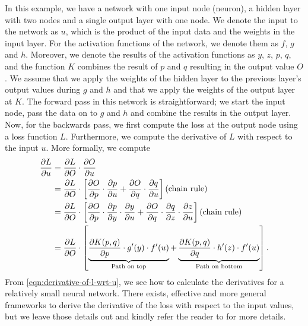 In this example, we have a network with one input node (neuron), a hidden layer with two nodes and a single output layer with one node. We denote the input to the network as $u$, which is the product of the input data and the weights in the input layer. For the activation functions of the network, we denote them as $f$, $g$ and $h$. Moreover, we denote the results of the activation functions as $y$, $z$, $p$, $q$, and the function $K$ combines the result of $p$ and $q$ resulting in the output value $O$. We assume that we apply the weights of the hidden layer to the previous layer's output values during $g$ and $h$ and that we apply the weights of the output layer at $K$. The forward pass in this network is straightforward; we start the input node, pass the data on to $g$ and $h$ and combine the results in the output layer. Now, for the backwards pass, we first compute the loss at the output node using a loss function $L$. Furthermore, we compute the derivative of $L$ with respect to the input $u$. More formally, we compute
\begin{align}
    \parder{L}{u}
    &= \parder{L}{O} \cdot \parder{O}{u} \label{eqn:derivative-of-l-wrt-u} \\
    &= \parder{L}{O} \cdot \left[
    \parder{O}{p} \cdot \parder{p}{u} +
    \parder{O}{q} \cdot \parder{q}{u}
    \right] \text{(chain rule)} \notag \\
    &= \parder{L}{O} \cdot \left[
    \parder{O}{p} \cdot \parder{p}{y} \cdot \parder{y}{u} + 
    \parder{O}{q} \cdot \parder{q}{z} \cdot \parder{z}{u}
    \right] \text{(chain rule)} \notag \\
    &= \parder{L}{O} \cdot \left[
    \undertext{\parder{K(p, q)}{p} \cdot g'(y) \cdot f'(u)}{Path on top} + 
    \undertext{\parder{K(p, q)}{q} \cdot h'(z) \cdot f'(u)}{Path on bottom} \notag
    \right].
\end{align}
From \cref{eqn:derivative-of-l-wrt-u}, we see how to calculate the derivatives for a relatively small neural network. There exists, effective and more general frameworks to derive the derivative of the loss with respect to the input values, but we leave those details out and kindly refer the reader to \cite[Chapter 1.3]{Aggarwal18} for more details.

